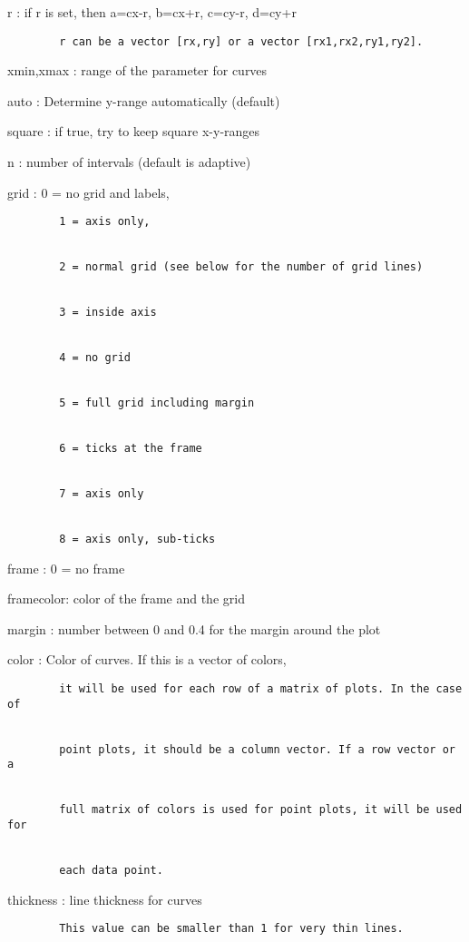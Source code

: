 \documentclass[
]{book}
\begin{document}
r : if r is set, then a=cx-r, b=cx+r, c=cy-r, d=cy+r

\begin{verbatim}
        r can be a vector [rx,ry] or a vector [rx1,rx2,ry1,ry2].
\end{verbatim}

xmin,xmax : range of the parameter for curves

auto : Determine y-range automatically (default)

square : if true, try to keep square x-y-ranges

n : number of intervals (default is adaptive)

grid : 0 = no grid and labels,

\begin{verbatim}
        1 = axis only,


        2 = normal grid (see below for the number of grid lines)


        3 = inside axis


        4 = no grid


        5 = full grid including margin


        6 = ticks at the frame


        7 = axis only


        8 = axis only, sub-ticks
\end{verbatim}

frame : 0 = no frame

framecolor: color of the frame and the grid

margin : number between 0 and 0.4 for the margin around the plot

color : Color of curves. If this is a vector of colors,

\begin{verbatim}
        it will be used for each row of a matrix of plots. In the case of


        point plots, it should be a column vector. If a row vector or a


        full matrix of colors is used for point plots, it will be used for


        each data point.
\end{verbatim}

thickness : line thickness for curves

\begin{verbatim}
        This value can be smaller than 1 for very thin lines.
\end{verbatim}
\end{document}
